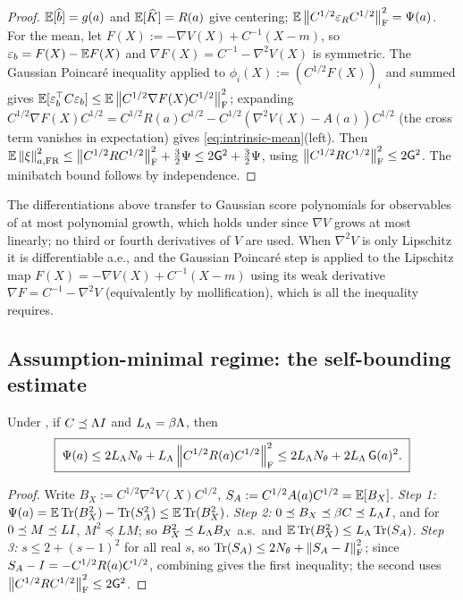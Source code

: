 \begin{proof}
$\mathbb{E}[\widehat b]=g(a)$ and $\mathbb{E}[\widehat K]=R(a)$ give centering; $\mathbb{E}\left\lVert C^{1/2}\varepsilon_RC^{1/2}\right\rVert_{\mathrm{F}}^2=\Psi(a)$.
For the mean, let $F(X):=-\nabla V(X)+C^{-1}(X-m)$, so $\varepsilon_b=F(X)-\mathbb{E} F(X)$ and $\nabla F(X)=C^{-1}-\nabla^2V(X)$
is symmetric. The Gaussian Poincar\'e inequality applied to $\phi_i(X):=(C^{1/2}F(X))_i$ and summed gives
$\mathbb{E}[\varepsilon_b^\top C\varepsilon_b]\leq\mathbb{E}\left\lVert C^{1/2}\nabla F(X)C^{1/2}\right\rVert_{\mathrm{F}}^2$; expanding
$C^{1/2}\nabla F(X)C^{1/2}=C^{1/2}R(a)C^{1/2}-C^{1/2}(\nabla^2V(X)-A(a))C^{1/2}$ (the cross term
vanishes in expectation) gives \eqref{eq:intrinsic-mean}(left). Then
$\mathbb{E}\left\lVert \xi\right\rVert_{a,\mathrm{FR}}^2\leq\left\lVert C^{1/2}RC^{1/2}\right\rVert_{\mathrm{F}}^2+\tfrac32\Psi\leq2\mathsf{G}^2+\tfrac32\Psi$,
using $\left\lVert C^{1/2}RC^{1/2}\right\rVert_{\mathrm{F}}^2\leq2\mathsf{G}^2$. The minibatch bound follows by independence.
\end{proof}

\begin{remark}[Regularity]
\label{rem:regularity}
The differentiations above transfer to Gaussian score polynomials for observables of at most
polynomial growth, which holds under  since $\nabla V$ grows at most
linearly; no third or fourth derivatives of $V$ are used. When $\nabla^2V$ is only Lipschitz it is
differentiable a.e., and the Gaussian Poincar\'e step is applied to the Lipschitz map
$F(X)=-\nabla V(X)+C^{-1}(X-m)$ using its weak derivative $\nabla F=C^{-1}-\nabla^2V$ (equivalently by
mollification), which is all the inequality requires.
\end{remark}

\subsection{Assumption-minimal regime: the self-bounding estimate}
\label{sec:stoch-selfbound}

\begin{lemma}
\label{lem:Psi-self-bound}
Under , if $C\preceq\Lambda I$ and $L_\Lambda=\beta\Lambda$, then
\begin{equation}
\label{eq:Psi-self-bound}
    \boxed{\;
    \Psi(a)\leq2L_\Lambda N_\theta+L_\Lambda\left\lVert C^{1/2}R(a)C^{1/2}\right\rVert_{\mathrm{F}}^2
    \leq2L_\Lambda N_\theta+2L_\Lambda\,\mathsf{G}(a)^2 .
    \;}
\end{equation}
\end{lemma}

\begin{proof}
Write $B_X:=C^{1/2}\nabla^2V(X)C^{1/2}$, $S_A:=C^{1/2}A(a)C^{1/2}=\mathbb{E}[B_X]$. \emph{Step 1:}
$\Psi(a)=\mathbb{E}\operatorname{Tr}(B_X^2)-\operatorname{Tr}(S_A^2)\leq\mathbb{E}\operatorname{Tr}(B_X^2)$. \emph{Step 2:} $0\preceq B_X\preceq\beta C\preceq L_\Lambda I$,
and for $0\preceq M\preceq LI$, $M^2\preceq LM$; so $B_X^2\preceq L_\Lambda B_X$ a.s.\ and
$\mathbb{E}\operatorname{Tr}(B_X^2)\leq L_\Lambda\operatorname{Tr}(S_A)$. \emph{Step 3:} $s\leq2+(s-1)^2$ for all real $s$, so
$\operatorname{Tr}(S_A)\leq2N_\theta+\left\lVert S_A-I\right\rVert_{\mathrm{F}}^2$; since $S_A-I=-C^{1/2}R(a)C^{1/2}$, combining gives
the first inequality; the second uses $\left\lVert C^{1/2}RC^{1/2}\right\rVert_{\mathrm{F}}^2\leq2\mathsf{G}^2$.
\end{proof}

